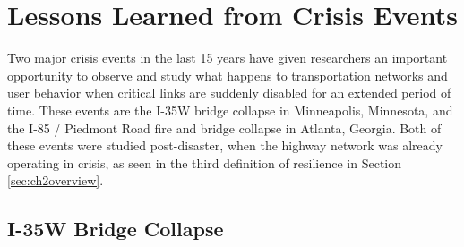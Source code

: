 \begin{table}

\caption{AEM Criticality Score \citet{aem2017}}
\label{tab:aemscore}
\end{table}

\section{Lessons Learned from Crisis Events}

Two major crisis events in the last 15 years have given researchers
an important opportunity
to observe and study what happens to transportation networks and user behavior when critical links are
suddenly disabled for an
extended period of time. These events are the I-35W bridge
collapse in
Minneapolis, Minnesota, and the I-85 / Piedmont Road fire and bridge
collapse in Atlanta, Georgia. Both of these events were studied post-disaster,
when the highway network was already operating in crisis, as seen in the third
definition of resilience in Section \ref{sec:ch2overview}.

\subsection{I-35W Bridge Collapse}

